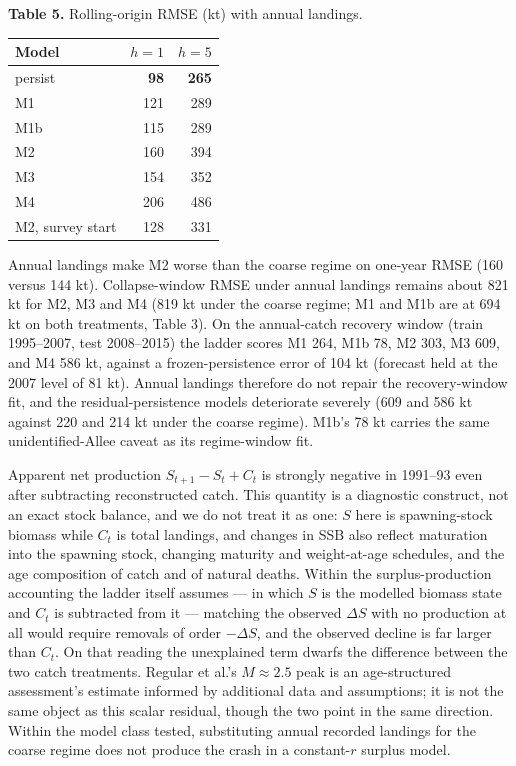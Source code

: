 \documentclass[11pt]{article}
\begin{document}
\textbf{Table 5.} Rolling-origin RMSE (kt) with annual landings.

\begin{longtable}[]{@{}lrr@{}}
\toprule\noalign{}
Model & \(h=1\) & \(h=5\) \\
\midrule\noalign{}
\endhead
\bottomrule\noalign{}
\endlastfoot
persist & \textbf{98} & \textbf{265} \\
M1 & 121 & 289 \\
M1b & 115 & 289 \\
M2 & 160 & 394 \\
M3 & 154 & 352 \\
M4 & 206 & 486 \\
M2, survey start & 128 & 331 \\
\end{longtable}

Annual landings make M2 worse than the coarse regime on one-year RMSE
(160 versus 144 kt). Collapse-window RMSE under annual landings remains
about 821 kt for M2, M3 and M4 (819 kt under the coarse regime; M1 and
M1b are at 694 kt on both treatments, Table 3). On the annual-catch recovery window (train 1995--2007, test 2008--2015)
the ladder scores M1 264, M1b 78, M2 303, M3 609, and M4 586 kt, against
a frozen-persistence error of 104 kt (forecast held at the 2007 level of
81 kt). Annual landings therefore do not repair the recovery-window fit,
and the residual-persistence models deteriorate severely (609 and 586 kt
against 220 and 214 kt under the coarse regime). M1b's 78 kt carries the
same unidentified-Allee caveat as its regime-window fit.

Apparent net production \(S_{t+1}-S_t+C_t\) is strongly negative in
1991--93 even after subtracting reconstructed catch. This quantity is a
diagnostic construct, not an exact stock balance, and we do not treat it
as one: \(S\) here is spawning-stock biomass while \(C_t\) is total
landings, and changes in SSB also reflect maturation into the spawning
stock, changing maturity and weight-at-age schedules, and the age
composition of catch and of natural deaths. Within the surplus-production
accounting the ladder itself assumes --- in which \(S\) is the modelled
biomass state and \(C_t\) is subtracted from it --- matching the observed
\(\Delta S\) with no production at all would require removals of order
\(-\Delta S\), and the observed decline is far larger than \(C_t\). On
that reading the unexplained term dwarfs the difference between the two
catch treatments.
Regular et al.'s \(M \approx 2.5\) peak is an age-structured assessment's
estimate informed by additional data and assumptions; it is not the same
object as this scalar residual, though the two point in the same
direction. Within the model class tested, substituting annual recorded landings
for the coarse regime does not produce the crash in a constant-\(r\)
surplus model.
\end{document}
